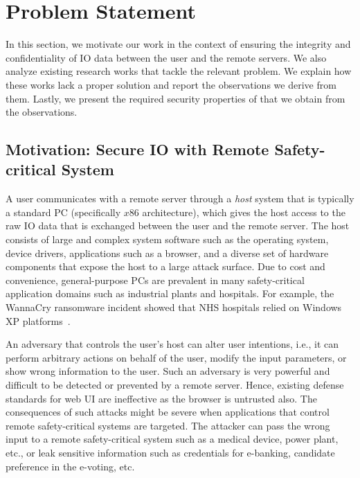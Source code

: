 \section{Problem Statement}
\label{sec:problemStatementProtection}

In this section, we motivate our work in the context of ensuring the integrity and confidentiality of IO data between the user and the remote servers. We also analyze existing research works that tackle the relevant problem. We explain how these works lack a proper solution and report the observations we derive from them. Lastly, we present the required security properties of \name that we obtain from the observations.

\subsection{Motivation: Secure IO with Remote Safety-critical System}

A user communicates with a remote server through a \emph{host} system that is typically a standard PC (specifically $x86$ architecture), which gives the host access to the raw IO data that is exchanged between the user and the remote server. The host consists of large and complex system software such as the operating system, device drivers, applications such as a browser, and a diverse set of hardware components that expose the host to a large attack surface. Due to cost and convenience, general-purpose PCs are prevalent in many safety-critical application domains such as industrial plants and hospitals. For example, the WannaCry ransomware incident showed that NHS hospitals relied on Windows XP platforms~\cite{berry_2017,field_wannacry_2018}. 

An adversary that controls the user's host can alter user intentions, i.e., it can perform arbitrary actions on behalf of the user, modify the input parameters, or show wrong information to the user. Such an adversary is very powerful and difficult to be detected or prevented by a remote server. Hence, existing defense standards for web UI are ineffective as the browser is untrusted also. The consequences of such attacks might be severe when applications that control remote safety-critical systems are targeted. 
The attacker can pass the wrong input to a remote safety-critical system such as a medical device, power plant, etc., or leak sensitive information such as credentials for e-banking, candidate preference in the e-voting, etc.




